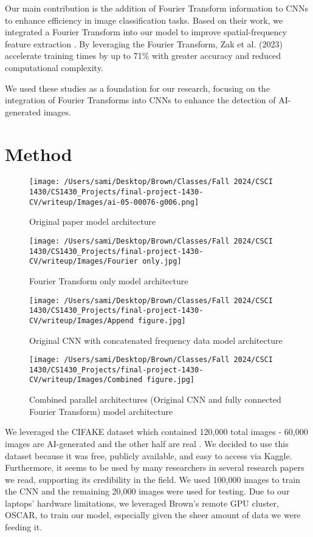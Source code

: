Our main contribution is the addition of Fourier Transform information to CNNs to enhance efficiency in image classification tasks. Based on their work, we integrated a Fourier Transform into our model to improve spatial-frequency feature extraction \cite{5}. By leveraging the Fourier Transform, Zak et al. (2023) accelerate training times by up to 71\% with greater accuracy and reduced computational complexity.

We used these studies as a foundation for our research, focusing on the integration of Fourier Transforms into CNNs to enhance the detection of AI-generated images. 
\section{Method}

\begin{figure}[htbp]
    \centering
    \begin{minipage}{0.4\textwidth} %
        \centering
        \texttt{[image: /Users/sami/Desktop/Brown/Classes/Fall 2024/CSCI 1430/CS1430\_Projects/final-project-1430-CV/writeup/Images/ai-05-00076-g006.png]}
        \caption{Original paper model architecture}\label{fig:fig1}

        \texttt{[image: /Users/sami/Desktop/Brown/Classes/Fall 2024/CSCI 1430/CS1430\_Projects/final-project-1430-CV/writeup/Images/Fourier only.jpg]}
        \caption{Fourier Transform only model architecture}\label{fig:fig2}

        \texttt{[image: /Users/sami/Desktop/Brown/Classes/Fall 2024/CSCI 1430/CS1430\_Projects/final-project-1430-CV/writeup/Images/Append figure.jpg]}
        \caption{Original CNN with concatenated frequency data model architecture}\label{fig:fig3}

        \texttt{[image: /Users/sami/Desktop/Brown/Classes/Fall 2024/CSCI 1430/CS1430\_Projects/final-project-1430-CV/writeup/Images/Combined figure.jpg]}
        \caption{Combined parallel architectures (Original CNN and fully connected Fourier Transform) model architecture}\label{fig:fig4}
        
        
        \label{fig:vertical_boxed_images}
    \end{minipage}%
\end{figure}

We leveraged the CIFAKE dataset which contained 120,000 total images - 60,000 images are AI-generated and the other half are real \cite{1}. We decided to use this dataset because it was free, publicly available, and easy to access via Kaggle. Furthermore, it seems to be used by many researchers in several research papers we read, supporting its credibility in the field. We used 100,000 images to train the CNN and the remaining 20,000 images were used for testing. Due to our laptops’ hardware limitations, we leveraged Brown’s remote GPU cluster, OSCAR, to train our model, especially given the sheer amount of data we were feeding it.

